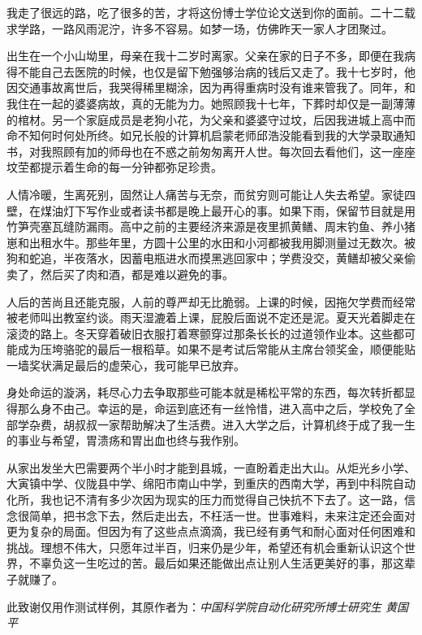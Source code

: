 \begin{acknowledgment}
我走了很远的路，吃了很多的苦，才将这份博士学位论文送到你的面前。二十二载求学路，一路风雨泥泞，许多不容易。如梦一场，仿佛昨天一家人才团聚过。

出生在一个小山坳里，母亲在我十二岁时离家。父亲在家的日子不多，即便在我病得不能自己去医院的时候，也仅是留下勉强够治病的钱后又走了。我十七岁时，他因交通事故离世后，我哭得稀里糊涂，因为再得重病时没有谁来管我了。同年，和我住在一起的婆婆病故，真的无能为力。她照顾我十七年，下葬时却仅是一副薄薄的棺材。另一个家庭成员是老狗小花，为父亲和婆婆守过坟，后因我进城上高中而命不知何时何处所终。如兄长般的计算机启蒙老师邱浩没能看到我的大学录取通知书，对我照顾有加的师母也在不惑之前匆匆离开人世。每次回去看他们，这一座座坟茔都提示着生命的每一分钟都弥足珍贵。

人情冷暖，生离死别，固然让人痛苦与无奈，而贫穷则可能让人失去希望。家徒四壁，在煤油灯下写作业或者读书都是晚上最开心的事。如果下雨，保留节目就是用竹笋壳塞瓦缝防漏雨。高中之前的主要经济来源是夜里抓黄鳝、周末钓鱼、养小猪崽和出租水牛。那些年里，方圆十公里的水田和小河都被我用脚测量过无数次。被狗和蛇追，半夜落水，因蓄电瓶进水而摸黑逃回家中；学费没交，黄鳝却被父亲偷卖了，然后买了肉和酒，都是难以避免的事。

人后的苦尚且还能克服，人前的尊严却无比脆弱。上课的时候，因拖欠学费而经常被老师叫出教室约谈。雨天湿漉着上课，屁股后面说不定还是泥。夏天光着脚走在滚烫的路上。冬天穿着破旧衣服打着寒颤穿过那条长长的过道领作业本。这些都可能成为压垮骆驼的最后一根稻草。如果不是考试后常能从主席台领奖金，顺便能贴一墙奖状满足最后的虚荣心，我可能早已放弃。

身处命运的漩涡，耗尽心力去争取那些可能本就是稀松平常的东西，每次转折都显得那么身不由己。幸运的是，命运到底还有一丝怜惜，进入高中之后，学校免了全部学杂费，胡叔叔一家帮助解决了生活费。进入大学之后，计算机终于成了我一生的事业与希望，胃溃疡和胃出血也终与我作别。

从家出发坐大巴需要两个半小时才能到县城，一直盼着走出大山。从炬光乡小学、大寅镇中学、仪陇县中学、绵阳市南山中学，到重庆的西南大学，再到中科院自动化所，我也记不清有多少次因为现实的压力而觉得自己快抗不下去了。这一路，信念很简单，把书念下去，然后走出去，不枉活一世。世事难料，未来注定还会面对更为复杂的局面。但因为有了这些点点滴滴，我已经有勇气和耐心面对任何困难和挑战。理想不伟大，只愿年过半百，归来仍是少年，希望还有机会重新认识这个世界，不辜负这一生吃过的苦。最后如果还能做出点让别人生活更美好的事，那这辈子就赚了。

此致谢仅用作测试样例，其原作者为：\emph{中国科学院自动化研究所博士研究生 \quad 黄国平} 
\end{acknowledgment}


